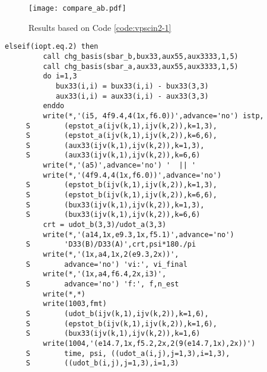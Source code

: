 \documentclass[12pt]{amsart}
\begin{document}
\begin{figure}[h]
  \texttt{[image: compare\_ab.pdf]}
  \caption{Results based on Code \ref{code:vpscin2-1}}
  \label{fig:ivgvar32_rst}
\end{figure}
\newpage
\begin{lstlisting}[style=Fortran,caption=A portion of code in which standard output stream is processed for IVGVAR32, label={code:stdout2_32}]
      elseif(iopt.eq.2) then
         call chg_basis(sbar_b,bux33,aux55,aux3333,1,5)
         call chg_basis(sbar_a,aux33,aux55,aux3333,1,5)
         do i=1,3
            bux33(i,i) = bux33(i,i) - bux33(3,3)
            aux33(i,i) = aux33(i,i) - aux33(3,3)
         enddo
         write(*,'(i5, 4f9.4,4(1x,f6.0))',advance='no') istp,
     S        (epstot_a(ijv(k,1),ijv(k,2)),k=1,3),
     S        (epstot_a(ijv(k,1),ijv(k,2)),k=6,6),
     S        (aux33(ijv(k,1),ijv(k,2)),k=1,3),
     S        (aux33(ijv(k,1),ijv(k,2)),k=6,6)
         write(*,'(a5)',advance='no') '  || '
         write(*,'(4f9.4,4(1x,f6.0))',advance='no')
     S        (epstot_b(ijv(k,1),ijv(k,2)),k=1,3),
     S        (epstot_b(ijv(k,1),ijv(k,2)),k=6,6),
     S        (bux33(ijv(k,1),ijv(k,2)),k=1,3),
     S        (bux33(ijv(k,1),ijv(k,2)),k=6,6)
         crt = udot_b(3,3)/udot_a(3,3)
         write(*,'(a14,1x,e9.3,1x,f5.1)',advance='no')
     S        'D33(B)/D33(A)',crt,psi*180./pi
         write(*,'(1x,a4,1x,2(e9.3,2x))',
     S        advance='no') 'vi:', vi_final
         write(*,'(1x,a4,f6.4,2x,i3)',
     S        advance='no') 'f:', f,n_est
         write(*,*)
         write(1003,fmt)
     S        (udot_b(ijv(k,1),ijv(k,2)),k=1,6),
     S        (epstot_b(ijv(k,1),ijv(k,2)),k=1,6),
     S        (bux33(ijv(k,1),ijv(k,2)),k=1,6)
         write(1004,'(e14.7,1x,f5.2,2x,2(9(e14.7,1x),2x))')
     S        time, psi, ((udot_a(i,j),j=1,3),i=1,3),
     S        ((udot_b(i,j),j=1,3),i=1,3)
\end{lstlisting}
\end{document}
